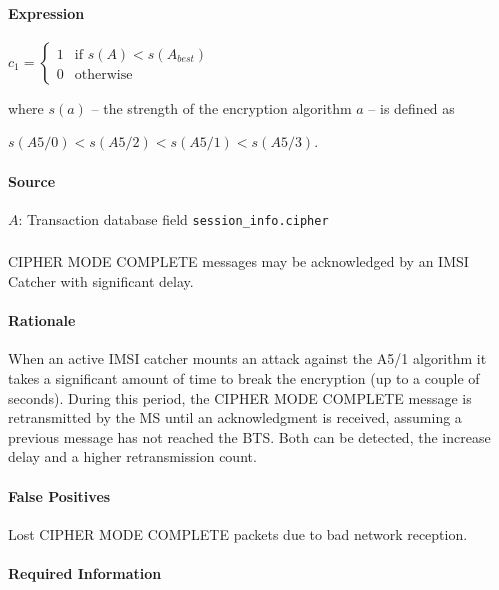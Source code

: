 \documentclass[a4paper,11pt,notitlepage,bigheadings,oneside]{scrartcl}
\begin{document}
\paragraph{Expression}

$c_1 =
\begin{cases}
	1 & \text{if } s(A) < s(A_{best}) \\
	0 & \text{otherwise}
\end{cases}$

where $s(a)$ -- the strength of the encryption algorithm $a$ -- is defined as

$s(A5/0) < s(A5/2) < s(A5/1) < s(A5/3)$.

\paragraph{Source}

$A$: Transaction database field \verb|session_info.cipher|

\subsubsection{}

CIPHER MODE COMPLETE messages may be acknowledged by an IMSI Catcher with
significant delay.

\paragraph{Rationale}

When an active IMSI catcher mounts an attack against the A5/1 algorithm it
takes a significant amount of time to break the encryption (up to a couple of
seconds). During this period, the CIPHER MODE COMPLETE message is retransmitted
by the MS until an acknowledgment is received, assuming a previous message has
not reached the BTS. Both can be detected, the increase delay and a higher
retransmission count.

\paragraph{False Positives}

Lost CIPHER MODE COMPLETE packets due to bad network reception.

\paragraph{Required Information}
\end{document}
